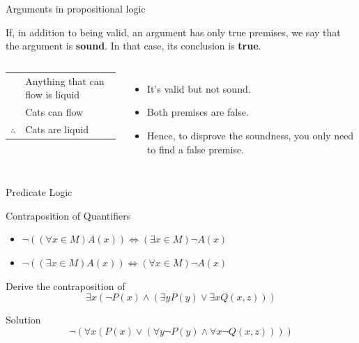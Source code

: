 \begin{frame}{Arguments in propositional logic}
    \begin{definition}
        If, in addition to being valid, an argument has only true premises, we say that the argument is \textbf{sound}. In that case, its conclusion is \textbf{true}.
    \end{definition}
    \begin{columns}[t,onlytextwidth]
        \begin{center}
            \begin{tabular}{cl}
                &Anything that can flow is liquid\\
                &Cats can flow\\\hline
                $\therefore$ & Cats are liquid
            \end{tabular}
        \end{center}
        \mypause
        \begin{itemize}
            \item It's valid but not sound.
            \item Both premises are false.
            \item Hence, to disprove the soundness, you only need to find a false premise.
        \end{itemize}
        \end{columns}
\end{frame}

\begin{frame}{Predicate Logic}
    \begin{block}{Contraposition of Quantifiers}
    \begin{itemize}
        \item $\neg((\forall x\in M)A(x))\Leftrightarrow(\exists x\in M)\neg A(x)$
        \item $\neg((\exists x\in M)A(x))\Leftrightarrow(\forall x\in M)\neg A(x)$
    \end{itemize}
    \end{block}

    \begin{example}
        Derive the contraposition of $$\exists x\left(\neg P(x)\wedge(\exists y P(y)\vee\exists xQ(x,z))\right)$$
    \end{example}
    \mypause
    \begin{block}{Solution}
        $$\neg(\forall x(P(x)\vee(\forall y \neg P(y)\wedge\forall x\neg Q(x,z))))$$
    \end{block}
\end{frame}

